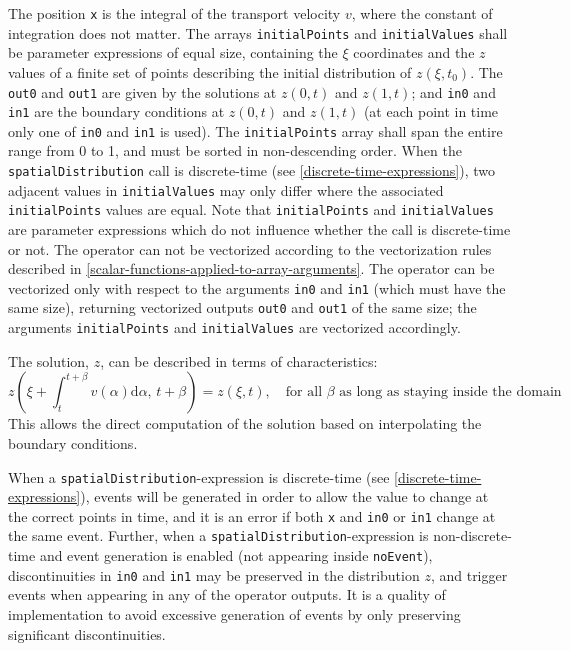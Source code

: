 The position \lstinline!x! is the integral of the transport velocity $v$, where the constant of integration does not matter.
The arrays \lstinline!initialPoints! and \lstinline!initialValues! shall be parameter expressions of equal size, containing the $\xi$ coordinates and the $z$ values of a finite set of points describing the initial distribution of $z(\xi, t_{0})$.
The \lstinline!out0! and \lstinline!out1! are given by the solutions at $z(0, t)$ and $z(1, t)$; and \lstinline!in0! and \lstinline!in1! are the boundary conditions at $z(0, t)$ and $z(1, t)$ (at each point in time only one of \lstinline!in0! and \lstinline!in1! is used).
The \lstinline!initialPoints! array shall span the entire range from 0 to 1, and must be sorted in non-descending order.
When the \lstinline!spatialDistribution! call is discrete-time (see \cref{discrete-time-expressions}), two adjacent values in \lstinline!initialValues! may only differ where the associated \lstinline!initialPoints! values are equal.
Note that \lstinline!initialPoints! and \lstinline!initialValues! are parameter expressions which do not influence whether the call is discrete-time or not.
The operator can not be vectorized according to the vectorization rules described in \cref{scalar-functions-applied-to-array-arguments}.
The operator can be vectorized only with respect to the arguments \lstinline!in0! and \lstinline!in1! (which must have the same size), returning vectorized outputs \lstinline!out0! and \lstinline!out1! of the same size; the arguments \lstinline!initialPoints! and \lstinline!initialValues! are vectorized accordingly.

The solution, $z$, can be described in terms of characteristics:
\begin{equation*}
z(\xi+\int_{t}^{t+\beta}\! v(\alpha) \mathrm{d}\alpha,\, t+\beta) = z(\xi, t), \quad\text{for all $\beta$ as long as staying inside the domain}
\end{equation*}
This allows the direct computation of the solution based on interpolating the boundary conditions.

When a \lstinline!spatialDistribution!-expression is discrete-time (see \cref{discrete-time-expressions}), events will be generated in order to allow the value to change at the correct points in time, and it is an error if both \lstinline!x! and \lstinline!in0! or \lstinline!in1! change at the same event.
Further, when a \lstinline!spatialDistribution!-expression is non-discrete-time and event generation is enabled (not appearing inside \lstinline!noEvent!), discontinuities in \lstinline!in0! and \lstinline!in1! may be preserved in the distribution $z$, and trigger events when appearing in any of the operator outputs.
It is a quality of implementation to avoid excessive generation of events by only preserving significant discontinuities.

